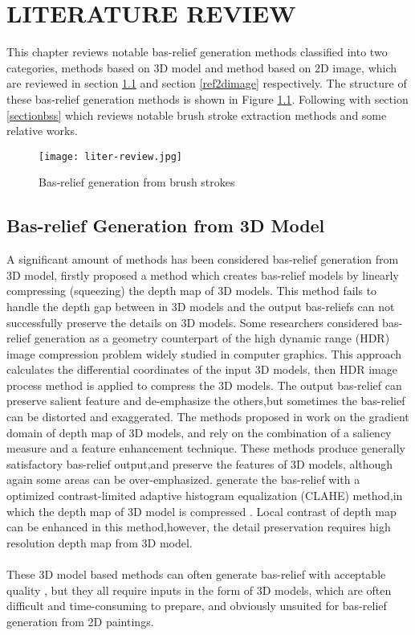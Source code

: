 \chapter{LITERATURE REVIEW}
This chapter reviews notable bas-relief generation methods classified into two categories, methods based on 3D model and method based on 2D image, which are reviewed in section \ref{ref3D} and section \ref{ref2dimage} respectively. The structure of these bas-relief generation methods is shown in Figure \ref{liter-review-stru}. Following with section \ref{sectionbss} which reviews notable brush stroke extraction methods and some relative works.
\begin{figure}[H]
	\centering
	\texttt{[image: liter-review.jpg]}
	\caption{Bas-relief generation from brush strokes}
	\label{liter-review-stru}
\end{figure}

\section{Bas-relief Generation from 3D Model}\label{ref3D}
A significant amount of methods has been considered bas-relief generation from 3D model,\cite{cignoni1997computer} firstly proposed a method which  creates bas-relief models by linearly compressing (squeezing) the
depth map of 3D models. This method fails to handle the depth gap between in 3D models and the output bas-reliefs can not successfully preserve the  details on 3D models. 
Some researchers considered bas-relief generation as a geometry counterpart of the  high dynamic range (HDR) image compression problem widely studied in computer graphics\cite{song2007automatic}. This approach calculates the differential coordinates of the input 3D models, then HDR image process method is applied to compress the 3D models. The output bas-relief can preserve salient feature and de-emphasize the others,but sometimes the bas-relief can be distorted and exaggerated. 
The methods proposed in \cite{kerber2009feature}\cite{kerber2012computer} work on the gradient domain of depth map of 3D models, and rely on the combination of a saliency measure and a feature enhancement technique. These methods produce generally satisfactory bas-relief output,and preserve the features of 3D models, although again some areas can be over-emphasized. 
\cite{sun2009bas} generate the bas-relief with a optimized contrast-limited adaptive histogram equalization (CLAHE) method,in which the depth map of 3D model is compressed . Local contrast of depth map can be enhanced in this method,however, the detail preservation requires high resolution depth map from 3D model. \\ \\ 
These 3D model based methods can often generate bas-relief with acceptable quality , but they all require inputs in the form of 3D models, which are often difficult and time-consuming to prepare, and obviously unsuited for bas-relief generation from 2D paintings. 


